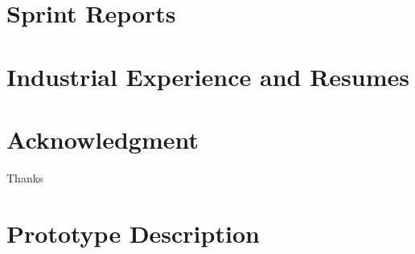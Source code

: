 \documentclass{book}
\begin{document}
\appendix



\chapter{Sprint Reports}


\chapter{Industrial Experience and Resumes}


\chapter{Acknowledgment}
\label{SpecialThanks}  
Thanks  

\chapter{Prototype Description}


\backmatter

%

\end{document}
